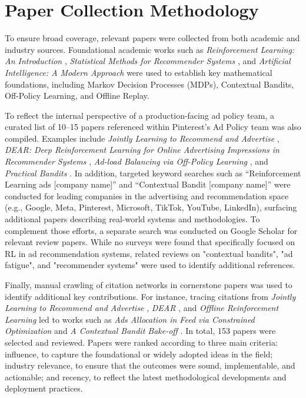 \documentclass[final]{anthology-ch}         %
\begin{document}

\section{Paper Collection Methodology}

To ensure broad coverage, relevant papers were collected from both academic and industry sources. Foundational academic works such as \textit{Reinforcement Learning: An Introduction} \cite{Sutton1998}, \textit{Statistical Methods for Recommender Systems} \cite{agarwal2016statistical}, and \textit{Artificial Intelligence: A Modern Approach} \cite{russell2016artificial} were used to establish key mathematical foundations, including Markov Decision Processes (MDPs), Contextual Bandits, Off-Policy Learning, and Offline Replay.

To reflect the internal perspective of a production-facing ad policy team, a curated list of 10–15 papers referenced within Pinterest’s Ad Policy team was also compiled. Examples include \textit{Jointly Learning to Recommend and Advertise} \cite{zhao2020jointly}, \textit{DEAR: Deep Reinforcement Learning for Online Advertising Impressions in Recommender Systems} \cite{zhao2021dear}, \textit{Ad-load Balancing via Off-Policy Learning} \cite{sagtani2024ad}, and \textit{Practical Bandits} \cite{van2024practical}. In addition, targeted keyword searches such as “Reinforcement Learning ads [company name]” and “Contextual Bandit [company name]” were conducted for leading companies in the advertising and recommendation space (e.g., Google, Meta, Pinterest, Microsoft, TikTok, YouTube, LinkedIn),  surfacing additional papers describing real-world systems and methodologies. To complement those efforts, a separate search was conducted on Google Scholar for relevant review papers. While no surveys were found that specifically focused on RL in ad recommendation systems, related reviews on "contextual bandits", "ad fatigue", and "recommender systems" were used to identify additional references.

Finally, manual crawling of citation networks in cornerstone papers was used to identify additional key contributions. For instance, tracing citations from \textit{Jointly Learning to Recommend and Advertise} \cite{zhao2020jointly}, \textit{DEAR} \cite{zhao2021dear}, and \textit{Offline Reinforcement Learning} \cite{levine2020offline} led to works such as \textit{Ads Allocation in Feed via Constrained Optimization} \cite{yan2020ads} and \textit{A Contextual Bandit Bake-off} \cite{bietti2021contextual}.
In total, 153 papers were selected and reviewed. Papers were ranked according to three main criteria: influence, to capture the foundational or widely adopted ideas in the field; industry relevance, to ensure that the outcomes were sound, implementable, and actionable; and recency, to reflect the latest methodological developments and deployment practices.
\end{document}
